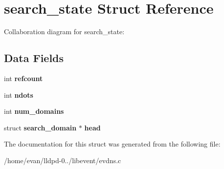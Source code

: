 \section{search\-\_\-state \-Struct \-Reference}
\label{structsearch__state}


\-Collaboration diagram for search\-\_\-state\-:
\subsection*{\-Data \-Fields}
\begin{DoxyCompactItemize}
\item 
int {\bfseries refcount}\label{structsearch__state_a6022c8a609170c7365fb96e83cb2df48}

\item 
int {\bfseries ndots}\label{structsearch__state_a7e4e4641922259f7b48c8a3191fbeb04}

\item 
int {\bfseries num\-\_\-domains}\label{structsearch__state_a09e9a0c7463b0b982c34040436c37e54}

\item 
struct {\bf search\-\_\-domain} $\ast$ {\bfseries head}\label{structsearch__state_a4c927360556d0347ed54a91a9853cb3f}

\end{DoxyCompactItemize}


\-The documentation for this struct was generated from the following file\-:\begin{DoxyCompactItemize}
\item 
/home/evan/lldpd-\/0../libevent/evdns.\-c\end{DoxyCompactItemize}

